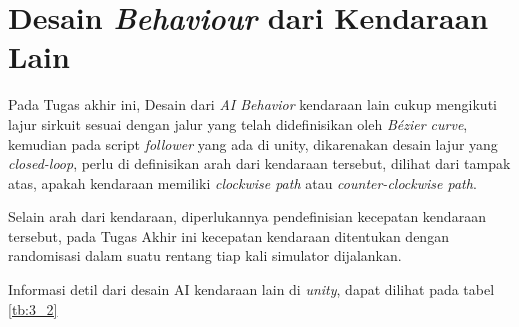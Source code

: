 \section{Desain \textit{Behaviour} dari Kendaraan Lain}
\vspace{1ex}

    \par Pada Tugas akhir ini, Desain dari \textit{AI Behavior} kendaraan lain cukup mengikuti lajur sirkuit sesuai dengan jalur yang telah didefinisikan oleh \textit{Bézier curve}, kemudian pada script \textit{follower} yang ada di unity, dikarenakan desain lajur yang \textit{closed-loop}, perlu di definisikan arah dari kendaraan tersebut, dilihat dari tampak atas, apakah kendaraan memiliki \textit{clockwise path} atau \textit{counter-clockwise path}.
    \par Selain arah dari kendaraan, diperlukannya pendefinisian kecepatan kendaraan tersebut, pada Tugas Akhir ini kecepatan kendaraan ditentukan dengan randomisasi dalam suatu rentang tiap kali simulator dijalankan.
    \par Informasi detil dari desain AI kendaraan lain di \textit{unity}, dapat dilihat pada tabel \ref{tb:3_2}

